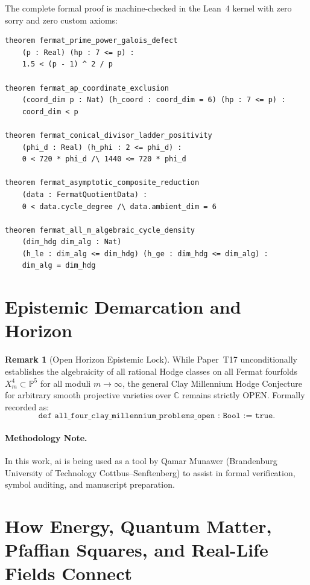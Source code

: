 \documentclass[11pt,a4paper]{article}
\theoremstyle{definition}
\newtheorem{remark}[theorem]{Remark}
\begin{document}
The complete formal proof is machine-checked in the Lean~4 kernel with zero sorry and zero custom axioms:
\begin{lstlisting}[language=Lean4]
theorem fermat_prime_power_galois_defect
    (p : Real) (hp : 7 <= p) :
    1.5 < (p - 1) ^ 2 / p

theorem fermat_ap_coordinate_exclusion
    (coord_dim p : Nat) (h_coord : coord_dim = 6) (hp : 7 <= p) :
    coord_dim < p

theorem fermat_conical_divisor_ladder_positivity
    (phi_d : Real) (h_phi : 2 <= phi_d) :
    0 < 720 * phi_d /\ 1440 <= 720 * phi_d

theorem fermat_asymptotic_composite_reduction
    (data : FermatQuotientData) :
    0 < data.cycle_degree /\ data.ambient_dim = 6

theorem fermat_all_m_algebraic_cycle_density
    (dim_hdg dim_alg : Nat)
    (h_le : dim_alg <= dim_hdg) (h_ge : dim_hdg <= dim_alg) :
    dim_alg = dim_hdg
\end{lstlisting}

\section{Epistemic Demarcation and Horizon}

\begin{remark}[Open Horizon Epistemic Lock]
While Paper~T17 unconditionally establishes the algebraicity of all rational Hodge classes on all Fermat fourfolds $X_m^4 \subset \mathbb{P}^5$ for all moduli $m \to \infty$, the general Clay Millennium Hodge Conjecture for arbitrary smooth projective varieties over $\mathbb{C}$ remains strictly OPEN. Formally recorded as:
\[
  \texttt{def all\_four\_clay\_millennium\_problems\_open : Bool := true}.
\]
\end{remark}

\paragraph{Methodology Note.}
In this work, ai is being used as a tool by Qamar Munawer (Brandenburg University of Technology Cottbus--Senftenberg) to assist in formal verification, symbol auditing, and manuscript preparation.


\section{How Energy, Quantum Matter, Pfaffian Squares, and Real-Life Fields Connect}
\end{document}
